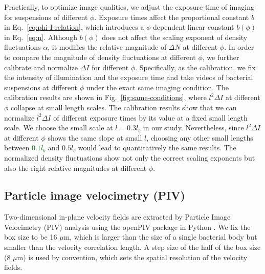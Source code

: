 \documentclass[twocolumn,aps,prx,amsmath,amssymb,longbibliography]{revtex4-2}
\begin{document}
Practically, to optimize image qualities, we adjust the exposure time of imaging for suspensions of different $\phi$. Exposure times affect the proportional constant $b$ in Eq.~\ref{eq:phi-I-relation}, which introduces a $\phi$-dependent linear constant $b(\phi)$ in Eq.~\ref{eq:n}. Although $b(\phi)$ does not affect the scaling exponent of density fluctuations $\alpha$, it modifies the relative magnitude of $\Delta N$ at different $\phi$. In order to compare the magnitude of density fluctuations at different $\phi$,  we further calibrate and normalize $\Delta I$ for different $\phi$. Specifically, as the calibration, we fix the intensity of illumination and the exposure time and take videos of bacterial suspensions at different $\phi$ under the exact same imaging condition. The calibration results are shown in Fig.~\ref{fig:same-conditions}, where $l^2 \Delta I$ at different $\phi$ collapse at small length scales. The calibration results show that we can normalize $l^2 \Delta I$ of different exposure times by its value at a fixed small length scale. We choose the small scale at $l = 0.3l_b$ in our study. Nevertheless, since $l^2 \Delta I$ at different $\phi$ shows the same slope at small $l$, choosing any other small lengths between \textcolor{darkgreen}{$0.1l_b$} and $0.5l_b$ would lead to quantitatively the same results. The normalized density fluctuations show not only the correct scaling exponents but also the right relative magnitudes at different $\phi$.


\subsection{Particle image velocimetry (PIV)}
\label{appendix-IA-PIV}

Two-dimensional in-plane velocity fields are extracted by Particle Image Velocimetry (PIV) analysis using the openPIV package in Python \cite{Liberzon2020}. We fix the box size to be 16 $\mu$m, which is larger than the size of a single bacterial body but smaller than the velocity correlation length. A step size of the half of the box size (8 $\mu$m) is used by convention, which sets the spatial resolution of the velocity fields.
\end{document}
